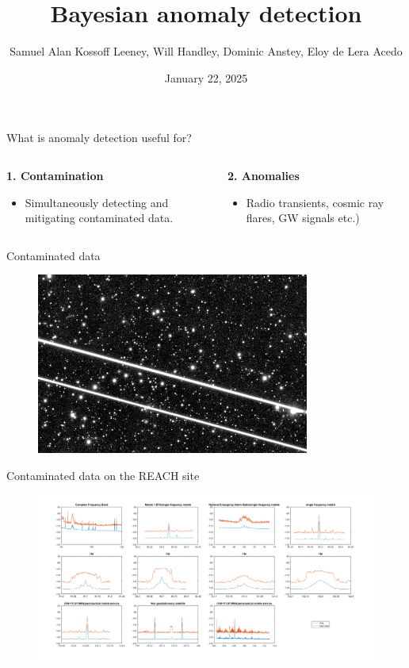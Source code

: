 \documentclass[aspectratio=169]{beamer}
\title{Bayesian anomaly detection}
\date{January 22, 2025}
\author{Samuel Alan Kossoff Leeney, Will Handley, Dominic Anstey, Eloy de Lera Acedo}
\institute{Will Handley's group meeting}
\begin{document}
\begin{frame}
  \titlepage
\end{frame}

\begin{frame}{What is anomaly detection useful for?}
  \begin{columns}
    \begin{column}{0.5\textwidth}
        \textbf{1. Contamination}
        \begin{itemize}
          \item Simultaneously detecting and mitigating contaminated data.
        \end{itemize}
    \end{column}
    \begin{column}{0.5\textwidth}
        \textbf{2. Anomalies}
        \begin{itemize}
          \item Radio transients, cosmic ray flares, GW signals etc.)
        \end{itemize}
    \end{column}
  \end{columns}
\end{frame}

\begin{frame}{Contaminated data}
  \begin{figure}
    \centering
    \includegraphics[width=0.8\textwidth]{images/starlink2.png}
  \end{figure}
\end{frame}

\begin{frame}{Contaminated data on the REACH site}
  \begin{figure}
    \centering
    \includegraphics[width=\textwidth]{images/rfi_site.png}
  \end{figure}
\end{frame}
\end{document}
